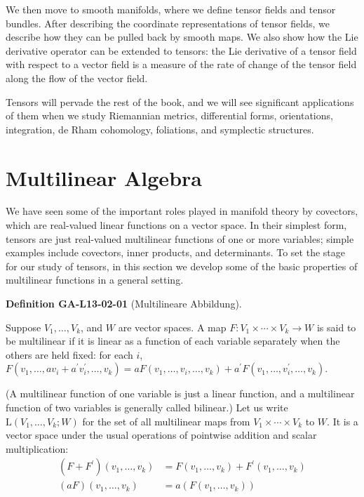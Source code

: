 \documentclass[10pt, letterpaper]{article}
\newcommand{\CustomHeading}[3]{%
  \par\medskip\noindent%
  \textbf{#1 #2} \textnormal{(#3)}.\enskip%
}
\newenvironment{DEF}[2]{\begin{unitbox}\CustomHeading{Definition}{#1}{#2}}{\end{unitbox}}
\begin{document}
We then move to smooth manifolds, where we define tensor fields and tensor bundles. After describing the coordinate representations of tensor fields, we describe how they can be pulled back by smooth maps. We also show how the Lie derivative operator can be extended to tensors: the Lie derivative of a tensor field with respect to a vector field is a measure of the rate of change of the tensor field along the flow of the vector field.

Tensors will pervade the rest of the book, and we will see significant applications of them when we study Riemannian metrics, differential forms, orientations, integration, de Rham cohomology, foliations, and symplectic structures.

\section*{Multilinear Algebra}
We have seen some of the important roles played in manifold theory by covectors, which are real-valued linear functions on a vector space. In their simplest form, tensors are just real-valued multilinear functions of one or more variables; simple examples include covectors, inner products, and determinants. To set the stage for our study of tensors, in this section we develop some of the basic properties of multilinear functions in a general setting.

\begin{DEF}{GA-L13-02-01}{Multilineare Abbildung}
Suppose $V_{1}, \ldots, V_{k}$, and $W$ are vector spaces. A map $F: V_{1} \times \cdots \times V_{k} \rightarrow W$ is said to be multilinear if it is linear as a function of each variable separately when the others are held fixed: for each $i$,\\
$F\left(v_{1}, \ldots, a v_{i}+a^{\prime} v_{i}^{\prime}, \ldots, v_{k}\right)=a F\left(v_{1}, \ldots, v_{i}, \ldots, v_{k}\right)+a^{\prime} F\left(v_{1}, \ldots, v_{i}^{\prime}, \ldots, v_{k}\right)$.

(A multilinear function of one variable is just a linear function, and a multilinear function of two variables is generally called bilinear.) Let us write $\mathrm{L}\left(V_{1}, \ldots, V_{k} ; W\right)$ for the set of all multilinear maps from $V_{1} \times \cdots \times V_{k}$ to $W$. It is a vector space under the usual operations of pointwise addition and scalar multiplication:
$$
\begin{aligned}
\left(F+F^{\prime}\right)\left(v_{1}, \ldots, v_{k}\right) & =F\left(v_{1}, \ldots, v_{k}\right)+F^{\prime}\left(v_{1}, \ldots, v_{k}\right) \\
(a F)\left(v_{1}, \ldots, v_{k}\right) & =a\left(F\left(v_{1}, \ldots, v_{k}\right)\right)
\end{aligned}
$$
\end{DEF}
\end{document}
